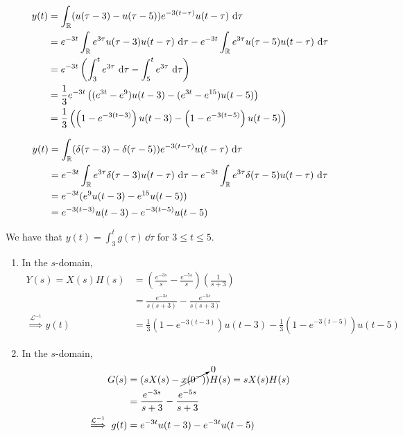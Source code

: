 \documentclass{article}
\begin{document}
\begin{subparts}
    \item \begin{align}
        y(t) &= \int_{\mathbb{R}} (u(\tau - 3) - u(\tau - 5)) e^{-3 (t - \tau)} u(t - \tau) \, \dd{\tau} \\
        &= e^{-3t} \int_{\mathbb{R}} e^{3 \tau} u(\tau - 3) u(t - \tau) \, \dd{\tau} - e^{-3t} \int_{\mathbb{R}} e^{3 \tau} u(\tau - 5) u(t - \tau) \, \dd{\tau} \\
        &= e^{-3t} \left(\int_3^t e^{3 \tau} \, \dd{\tau} - \int_5^t e^{3 \tau} \, \dd{\tau}\right) \\
        &= \frac{1}{3} e^{-3t} \left((e^{3t} - e^9) u(t - 3) - (e^{3t} - e^{15}) u(t - 5)\right) \\
        &= \frac{1}{3} \left(\left(1 - e^{-3 (t - 3)}\right) u(t - 3) - \left(1 - e^{-3 (t - 5)}\right) u(t - 5)\right)
    \end{align}
    \item \begin{align}
        y(t) &= \int_{\mathbb{R}} (\delta(\tau - 3) - \delta(\tau - 5)) e^{-3 (t - \tau)} u(t - \tau) \, \dd{\tau} \\
        &= e^{-3t} \int_{\mathbb{R}} e^{3 \tau} \delta(\tau - 3) u(t - \tau) \, \dd{\tau} - e^{-3t} \int_{\mathbb{R}} e^{3 \tau} \delta(\tau - 5) u(t - \tau) \, \dd{\tau} \\
        &= e^{-3t} (e^9 u(t - 3) - e^{15} u(t - 5)) \\
        &= e^{-3 (t - 3)} u(t - 3) - e^{-3 (t - 5)} u(t - 5)
    \end{align}
    \item We have that \(y(t) = \int_3^t g(\tau) \, \dd{\tau}\) for \(3 \leqslant t \leqslant 5\).
    \item
    \begin{enumerate}
        \item In the \(s\)-domain,
        \begin{align}
            Y(s) = X(s) H(s) &= \left(\frac{e^{-3s}}{s} - \frac{e^{-5s}}{s}\right) \left(\frac{1}{s + 3}\right) \\
            &= \frac{e^{-3s}}{s (s + 3)} - \frac{e^{-5s}}{s (s + 3)} \\
            \overset{\mathcal{L}^{-1}}{\implies} y(t) &= \frac{1}{3} (1 - e^{-3 (t - 3)}) u(t - 3) - \frac{1}{3} (1 - e^{-3 (t - 5)}) u(t - 5)
        \end{align}
        \item In the \(s\)-domain,
        \begin{align}
            G(s) &= (s X(s) - \cancelto{0}{x(0^-)}) H(s) = s X(s) H(s) \\
            &= \frac{e^{-3s}}{s + 3} - \frac{e^{-5s}}{s + 3} \\
            \overset{\mathcal{L}^{-1}}{\implies} g(t) &= e^{-3t} u(t - 3) - e^{-3t} u(t - 5)
        \end{align}
    \end{enumerate}
\end{subparts}
\end{document}
